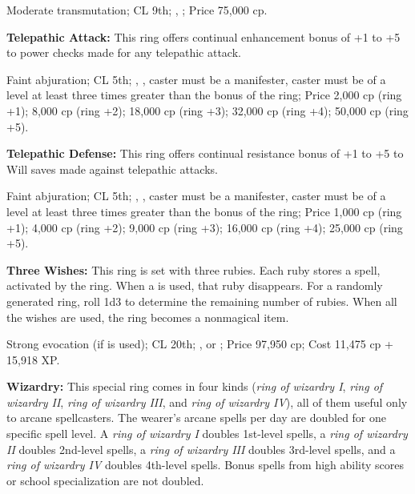 Moderate transmutation; CL 9th; , ; Price 75,000 cp.


\textbf{Telepathic Attack:} This ring offers continual enhancement bonus of +1 to +5 to power checks made for any telepathic attack.

Faint abjuration; CL 5th; , , caster must be a manifester, caster must be of a level at least three times greater than the bonus of the ring; Price 2,000 cp (ring +1); 8,000 cp (ring +2); 18,000 cp (ring +3); 32,000 cp (ring +4); 50,000 cp (ring +5).


\textbf{Telepathic Defense:} This ring offers continual resistance bonus of +1 to +5 to Will saves made against telepathic attacks.

Faint abjuration; CL 5th; , , caster must be a manifester, caster must be of a level at least three times greater than the bonus of the ring; Price 1,000 cp (ring +1); 4,000 cp (ring +2); 9,000 cp (ring +3); 16,000 cp (ring +4); 25,000 cp (ring +5).


\textbf{Three Wishes:} This ring is set with three rubies. Each ruby stores a  spell, activated by the ring. When a  is used, that ruby disappears. For a randomly generated ring, roll 1d3 to determine the remaining number of rubies. When all the wishes are used, the ring becomes a nonmagical item.

Strong evocation (if  is used); CL 20th; ,  or ; Price 97,950 cp; Cost 11,475 cp + 15,918 XP.





\textbf{Wizardry:} This special ring comes in four kinds (\emph{ring of wizardry I}, \emph{ring of wizardry II}, \emph{ring of wizardry III}, and \emph{ring of wizardry IV}), all of them useful only to arcane spellcasters. The wearer's arcane spells per day are doubled for one specific spell level. A \emph{ring of wizardry I} doubles 1st-level spells, a \emph{ring of wizardry II} doubles 2nd-level spells, a \emph{ring of wizardry III} doubles 3rd-level spells, and a \emph{ring of wizardry IV} doubles 4th-level spells. Bonus spells from high ability scores or school specialization are not doubled.

